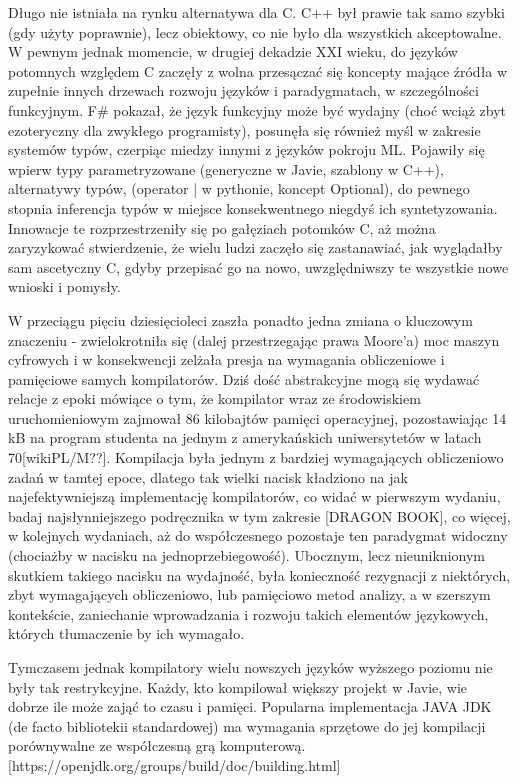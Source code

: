 Długo nie istniała na rynku alternatywa dla C. C++ był prawie tak samo szybki (gdy użyty poprawnie), lecz obiektowy, co nie było dla wszystkich akceptowalne. W pewnym jednak momencie, w drugiej dekadzie XXI wieku, do języków potomnych względem C zaczęły z wolna przesączać się koncepty mające źródła w zupełnie innych drzewach rozwoju języków i paradygmatach, w szczególności funkcyjnym. F\# pokazał, że język funkcyjny może być wydajny (choć wciąż zbyt ezoteryczny dla zwykłego programisty), posunęła się również myśl w zakresie systemów typów, czerpiąc miedzy innymi z języków pokroju ML. Pojawiły się wpierw typy parametryzowane (generyczne w Javie, szablony w C++), alternatywy typów, (operator | w pythonie, koncept Optional), do pewnego stopnia inferencja typów w miejsce konsekwentnego niegdyś ich syntetyzowania. Innowacje te rozprzestrzeniły się po gałęziach potomków C, aż można zaryzykować stwierdzenie, że wielu ludzi zaczęło się zastanawiać, jak wyglądałby sam ascetyczny C, gdyby przepisać go na nowo, uwzględniwszy te wszystkie nowe wnioski i pomysły.

W przeciągu pięciu dziesięcioleci zaszła ponadto jedna zmiana o kluczowym znaczeniu - zwielokrotniła się (dalej przestrzegając prawa Moore'a) moc maszyn cyfrowych i w konsekwencji zelżała presja na wymagania obliczeniowe i pamięciowe samych kompilatorów. Dziś dość abstrakcyjne mogą się wydawać relacje z epoki mówiące o tym, że kompilator wraz ze środowiskiem uruchomieniowym zajmował 86 kilobajtów pamięci operacyjnej, pozostawiając 14 kB na program studenta na jednym z amerykańskich uniwersytetów w latach 70[wikiPL/M??]. Kompilacja była jednym z bardziej wymagających obliczeniowo zadań w tamtej epoce, dlatego tak wielki nacisk kładziono na jak najefektywniejszą implementację kompilatorów, co widać w pierwszym wydaniu, badaj najsłynniejszego podręcznika w tym zakresie [DRAGON BOOK], co więcej, w kolejnych wydaniach, aż do współczesnego pozostaje ten paradygmat widoczny (chociażby w nacisku na jednoprzebiegowość).
Ubocznym, lecz nieuniknionym skutkiem takiego nacisku na wydajność, była konieczność rezygnacji z niektórych, zbyt wymagających obliczeniowo, lub pamięciowo metod analizy, a w szerszym kontekście, zaniechanie wprowadzania i rozwoju takich elementów językowych, których tłumaczenie by ich wymagało.

Tymczasem jednak kompilatory wielu nowszych języków wyższego poziomu nie były tak restrykcyjne. Każdy, kto kompilował większy projekt w Javie, wie dobrze ile może zająć to czasu i pamięci. Popularna implementacja JAVA JDK (de facto bibliotekii standardowej) ma wymagania sprzętowe do jej kompilacji porównywalne ze współczesną grą komputerową.
[https://openjdk.org/groups/build/doc/building.html]

